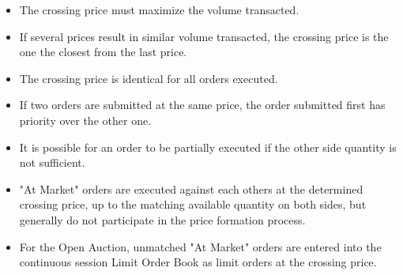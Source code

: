 \begin{itemize}
\item  The crossing price must maximize the volume transacted.
\item  If several prices result in similar volume transacted, the crossing price is the one the closest from the last price. 
\item  The crossing price is identical for all orders executed.
\item  If two orders are submitted at the same price, the order submitted first has priority over the other one.
\item  It is possible for an order to be partially executed if the other side quantity is not sufficient.
\item  "At Market" orders are executed against each others at the determined crossing price, up to the matching available quantity on both sides, but generally do not participate in the price formation process.
\item  For the Open Auction, unmatched "At Market" orders are entered into the continuous session Limit Order Book as limit orders at the crossing price.
\end{itemize} 



